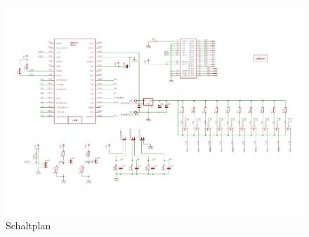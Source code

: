\begin{landscape}
	\begin{figure}[H]
		\centering
		\includegraphics[width=21cm]{Abbildungen/QlockToo_Schaltplan}
		\caption[Schaltplan]{Schaltplan}
		\label{fig:Schaltplan}

	\end{figure}
\end{landscape}
